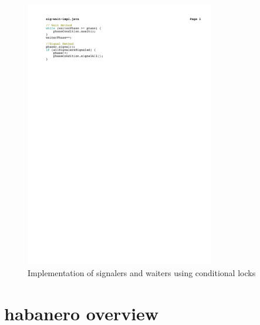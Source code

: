 \begin{figure}[t]
\centering
\includegraphics[width=3.25in]{../figs/sig-wait-impl}
\caption{Implementation of signalers and waiters using conditional locks}
\label{fig:sig-wait-impl}
\end{figure}

\section{habanero overview}

